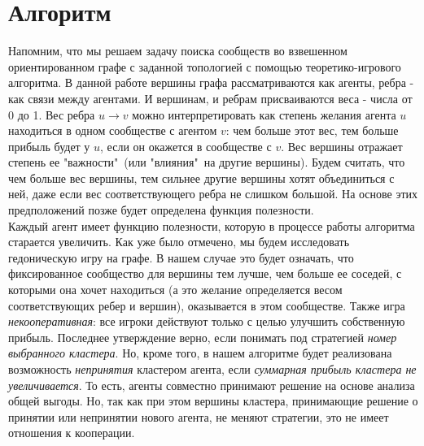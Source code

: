 \chapter{Алгоритм}
Напомним, что мы решаем задачу поиска сообществ во взвешенном ориентированном графе с заданной топологией с помощью теоретико-игрового алгоритма. В данной работе вершины графа рассматриваются как агенты, ребра - как связи между агентами. И вершинам, и ребрам присваиваются веса - числа от 0 до 1. Вес ребра $u\rightarrow v$ можно интерпретировать как степень желания агента $u$ находиться в одном сообществе с агентом $v$: чем больше этот вес, тем больше прибыль будет у $u$, если он окажется в сообществе с $v$. Вес вершины отражает степень ее "важности"\ (или "влияния"\ на другие вершины). Будем считать, что чем больше вес вершины, тем сильнее другие вершины хотят объединиться с ней, даже если вес соответствующего ребра не слишком большой. На основе этих предположений позже будет определена функция полезности.\\

Каждый агент имеет функцию полезности, которую в процессе работы алгоритма старается увеличить. Как уже было отмечено, мы будем исследовать гедоническую игру на графе. В нашем случае это будет означать, что фиксированное сообщество для вершины тем лучше, чем больше ее соседей, с которыми она хочет находиться (а это желание определяется весом соответствующих ребер и вершин), оказывается в этом сообществе. Также игра \textit{некооперативная}: все игроки действуют только с целью улучшить собственную прибыль. Последнее утверждение верно, если понимать под стратегией \textit{номер выбранного кластера}. Но, кроме того, в нашем алгоритме будет реализована возможность \textit{непринятия} кластером агента, если \textit{суммарная прибыль кластера не увеличивается}. То есть, агенты совместно принимают решение на основе анализа общей выгоды. Но, так как при этом вершины кластера, принимающие решение о принятии или непринятии нового агента, не меняют стратегии, это не имеет отношения к кооперации.\\

